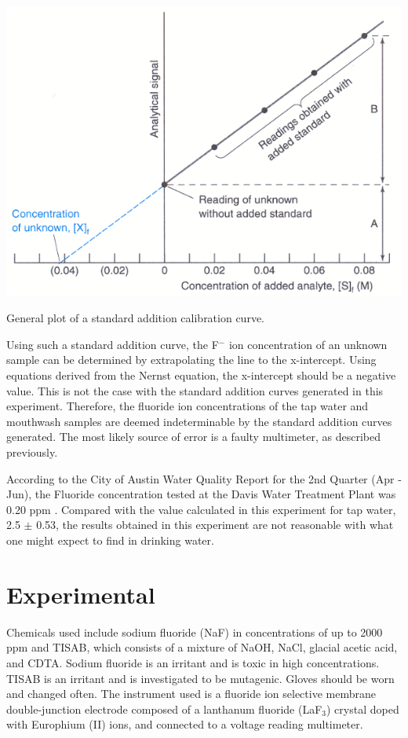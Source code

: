 \documentclass[journal=jacsat,manuscript=article,layout=twocolumn]{achemso}
\begin{document}
\begin{chart}
    \includegraphics[scale=0.4]{std}
    \caption{General plot of a standard addition calibration curve.}
\end{chart}

Using such a standard addition curve, the F$^-$ ion concentration of an unknown
sample can be determined by extrapolating the line to the x-intercept. Using
equations derived from the Nernst equation, the x-intercept should be a negative
value. This is not the case with the standard addition curves generated in this
experiment. Therefore, the fluoride ion concentrations of the tap water and
mouthwash samples are deemed indeterminable by the standard addition curves
generated. The most likely source of error is a faulty multimeter, as described
previously.

According to the City of Austin Water Quality Report for the 2nd Quarter (Apr -
Jun), the Fluoride concentration tested at the Davis Water Treatment Plant was
0.20 ppm \cite{atx}. Compared with the value calculated in this experiment for tap water, 2.5 $\pm$ 0.53,
the results obtained in this experiment are not reasonable with what one might
expect to find in drinking water.

\section {Experimental}

Chemicals used include sodium fluoride (NaF) in concentrations of up to 2000 ppm and TISAB,
which consists of a mixture of NaOH, NaCl, glacial acetic acid, and CDTA. Sodium
fluoride is an irritant and is toxic in high concentrations. TISAB is an
irritant and is investigated to be mutagenic. Gloves should be worn and changed
often.
The instrument used is a fluoride ion selective membrane double-junction electrode composed of a
lanthanum fluoride (LaF$_3$) crystal doped with Europhium (II) ions, and
connected to a voltage reading multimeter.
\end{document}
